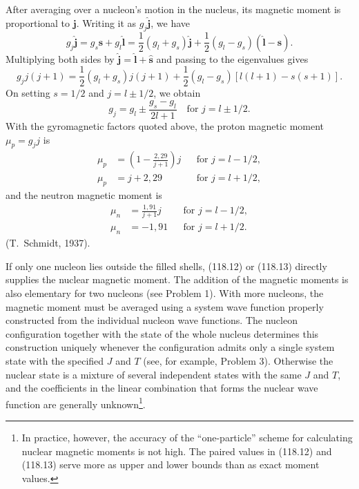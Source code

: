 After averaging over a nucleon's motion in the nucleus, its magnetic moment is
proportional to $\mathbf j$. Writing it as $g_j\hat{\mathbf j}$, we have
\[
 g_j\hat{\mathbf j}=g_s\hat{\mathbf s}+g_l\hat{\mathbf l}
 =\frac12(g_l+g_s)\hat{\mathbf j}
 +\frac12(g_l-g_s)(\hat{\mathbf l}-\hat{\mathbf s}).
\]
Multiplying both sides by
$\hat{\mathbf j}=\hat{\mathbf l}+\hat{\mathbf s}$ and passing to the
eigenvalues gives
\[
 g_jj(j+1)=\frac12(g_l+g_s)j(j+1)
 +\frac12(g_l-g_s)[l(l+1)-s(s+1)].
\]
On setting $s=1/2$ and $j=l\pm1/2$, we obtain
\begin{equation}
 g_j=g_l\pm\frac{g_s-g_l}{2l+1}\quad\text{for }j=l\pm1/2.
 \tag{118.11}
\end{equation}
With the gyromagnetic factors quoted above, the proton magnetic moment
$\mu_p=g_jj$ is
\begin{equation}
 \begin{aligned}
  \mu_p&=\left(1-\frac{2{,}29}{j+1}\right)j
     &&\text{for }j=l-1/2,\\
  \mu_p&=j+2{,}29 &&\text{for }j=l+1/2,
 \end{aligned}
 \tag{118.12}
\end{equation}
and the neutron magnetic moment is
\begin{equation}
 \begin{aligned}
  \mu_n&=\frac{1{,}91}{j+1}j &&\text{for }j=l-1/2,\\
  \mu_n&=-1{,}91 &&\text{for }j=l+1/2.
 \end{aligned}
 \tag{118.13}
\end{equation}
(T.~Schmidt, 1937).

If only one nucleon lies outside the filled shells, (118.12) or (118.13)
directly supplies the nuclear magnetic moment. The addition of the magnetic
moments is also elementary for two nucleons (see Problem 1). With more
nucleons, the magnetic moment must be averaged using a system wave function
properly constructed from the individual nucleon wave functions. The nucleon
configuration together with the state of the whole nucleus determines this
construction uniquely whenever the configuration admits only a single system
state with the specified $J$ and $T$ (see, for example, Problem 3). Otherwise
the nuclear state is a mixture of several independent states with the same
$J$ and $T$, and the coefficients in the linear combination that forms the
nuclear wave function are generally unknown\footnote{In practice, however,
the accuracy of the ``one-particle'' scheme for calculating nuclear magnetic
moments is not high. The paired values in (118.12) and (118.13) serve more as
upper and lower bounds than as exact moment values.}.

